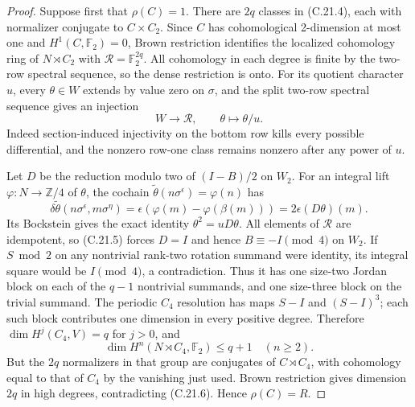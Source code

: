 \begin{proof}
Suppose first that $\rho(C)=1$.  There are $2q$
classes in (C.21.4), each with normalizer conjugate
to $C\times C_2$.  Since $C$ has cohomological
2-dimension at most one and $H^1(C,\mathbb F_2)=0$,
Brown restriction identifies the localized
cohomology ring of $N\rtimes C_2$ with
$\mathcal R=\mathbb F_2^{2q}$.  All cohomology
in each degree is finite by the two-row spectral
sequence, so the dense restriction is onto.
For its quotient character $u$, every $\theta\in W$
extends by value zero on $\sigma$, and the split
two-row spectral sequence gives an injection
\[
                     W\longrightarrow\mathcal R,\qquad
                              \theta\longmapsto\theta/u.
                                                               \tag{C.21.5}
\]
Indeed section-induced injectivity on the bottom
row kills every possible differential, and the
nonzero row-one class remains nonzero after any
power of $u$.

Let $D$ be the reduction modulo two of $(I-B)/2$
on $W_2$.  For an integral lift
$\varphi:N\to\mathbb Z/4$ of $\theta$, the cochain
$\widetilde\theta(n\sigma^\epsilon)=\varphi(n)$ has
\[
 \delta\widetilde\theta(n\sigma^\epsilon,m\sigma^\eta)
       =\epsilon(\varphi(m)-\varphi(\beta(m)))
       =2\epsilon(D\theta)(m).
\]
Its Bockstein gives the exact identity
$\theta^2=uD\theta$.  All elements of $\mathcal R$
are idempotent, so (C.21.5) forces $D=I$ and hence
$B\equiv-I\pmod4$ on $W_2$.
If $S\bmod2$ on any nontrivial rank-two rotation
summand were identity, its integral square would
be $I\pmod4$, a contradiction.  Thus it has one
size-two Jordan block on each of the $q-1$
nontrivial summands, and one size-three block on
the trivial summand.  The periodic $C_4$ resolution
has maps $S-I$ and $(S-I)^3$; each such block
contributes one dimension in every positive degree.
Therefore $\dim H^j(C_4,V)=q$ for $j>0$, and
\[
 \dim H^n(N\rtimes C_4,\mathbb F_2)\leq q+1
                                      \quad(n\geq2).       \tag{C.21.6}
\]
But the $2q$ normalizers in that group are conjugates
of $C\rtimes C_4$, with cohomology equal to that
of $C_4$ by the vanishing just used.  Brown
restriction gives dimension $2q$ in high degrees,
contradicting (C.21.6).  Hence $\rho(C)=R$.


\end{proof}
